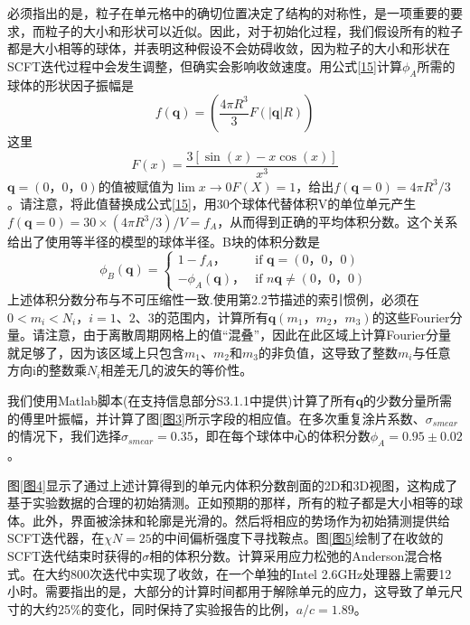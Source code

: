 \documentclass[12pt，a4paper]{article}
\numberwithin{equation}{section}
\begin{document}
必须指出的是，粒子在单元格中的确切位置决定了结构的对称性，是一项重要的要求，而粒子的大小和形状可以近似。因此，对于初始化过程，我们假设所有的粒子都是大小相等的球体，并表明这种假设不会妨碍收敛，因为粒子的大小和形状在SCFT迭代过程中会发生调整，但确实会影响收敛速度。用公式\ref{15}计算$\phi _A$所需的球体的形状因子振幅是
\begin{equation}\label{18}
f(\mathbf{q})=\left( \frac{4\pi R^3}{3}F(|\mathbf{q}|R) \right)
\end{equation}
这里
\begin{equation}\label{19}
F(x)=\frac{3\left[ \sin(x) -x\cos(x) \right]}{x^3}
\end{equation}
$\mathbf{q}=(0，0，0)$的值被赋值为$\lim x\rightarrow 0 F(X)=1$，给出$f(\mathbf{q}=0)=4\pi R^3/3$。请注意，将此值替换成公式\ref{15}，用30个球体代替体积V的单位单元产生$f(\mathbf{q}=0)=30×(4\pi R^3/3)/V=f_A$，从而得到正确的平均体积分数。这个关系给出了使用等半径的模型的球体半径。B块的体积分数是
\begin{equation}\label{20}
\phi _B(\mathbf{q}) =
\begin{cases}
1-f_A， & \mbox{if }\mathbf{q}=(0，0，0)\\
-\phi _A(\mathbf{q})， & \mbox{if }n\mathbf{q}\neq (0，0，0)
\end{cases}
\end{equation}
上述体积分数分布与不可压缩性一致.使用第2.2节描述的索引惯例，必须在$0<m_i<N_i，i=1、2、3$的范围内，计算所有$\mathbf{q}(m_1，m_2，m_3)$的这些Fourier分量。请注意，由于离散周期网格上的值“混叠”，因此在此区域上计算Fourier分量就足够了，因为该区域上只包含$m_1$、$m_2$和$m_3$的非负值，这导致了整数$m_i$与任意方向i的整数乘$N_i$相差无几的波矢的等价性。

我们使用Matlab脚本(在支持信息部分S3.1.1中提供)计算了所有$\mathbf{q}$的少数分量所需的傅里叶振幅，并计算了图\ref{图3}所示字段的相应值。在多次重复涂片系数、$\sigma _{smear}$的情况下，我们选择$\sigma _{smear}=0.35$，即在每个球体中心的体积分数$\phi _A=0.95\pm0.02$。

图\ref{图4}显示了通过上述计算得到的单元内体积分数剖面的2D和3D视图，这构成了基于实验数据的合理的初始猜测。正如预期的那样，所有的粒子都是大小相等的球体。此外，界面被涂抹和轮廓是光滑的。然后将相应的势场作为初始猜测提供给SCFT迭代器，在$\chi N=25$的中间偏析强度下寻找鞍点。图\ref{图5}绘制了在收敛的SCFT迭代结束时获得的$\sigma$相的体积分数。计算采用应力松弛的Anderson混合格式。在大约800次迭代中实现了收敛，在一个单独的Intel 2.6GHz处理器上需要12小时。需要指出的是，大部分的计算时间都用于解除单元的应力，这导致了单元尺寸的大约25\%的变化，同时保持了实验报告的比例，$a/c=1.89$。
\end{document}
